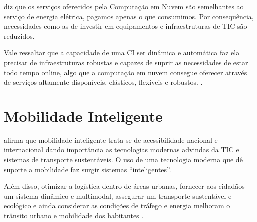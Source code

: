  diz que os serviços oferecidos pela Computação em Nuvem são semelhantes ao serviço de energia elétrica, pagamos apenas o que consumimos. Por consequência, necessidades como as de investir em equipamentos e infraestruturas de TIC são reduzidos.



Vale ressaltar que a capacidade de uma CI ser dinâmica e automática faz ela precisar de infraestruturas robustas e capazes de suprir as necessidades de estar todo tempo online, algo que a computação em nuvem consegue oferecer através de serviços altamente disponíveis, elásticos, flexíveis e robustos. \cite{kon-cloud}.


\section{Mobilidade Inteligente}



 afirma que mobilidade inteligente trata-se de acessibilidade nacional e internacional dando importância as tecnologias modernas advindas da TIC e sistemas de transporte sustentáveis. O uso de uma tecnologia moderna que dê suporte a mobilidade faz surgir sistemas “inteligentes”.

Além disso, otimizar a logística dentro de áreas urbanas, fornecer aos cidadãos um sistema dinâmico e multimodal, assegurar um transporte sustentável e ecológico e ainda considerar as condições de tráfego e energia melhoram o trânsito urbano e mobilidade dos habitantes \cite{neirotti}. %

